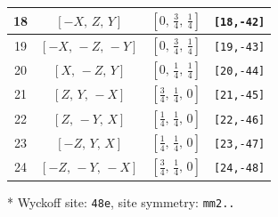 \documentclass[fleqn,8pt]{jsarticle}
\begin{document}
\begin{longtable}{cccc}
18 & $\left[ - X,\, Z,\, Y \right]$ & $\left[ 0,\, \frac{3}{4},\, \frac{1}{4} \right]$ & {\tt [18,-42]} \\ \hline
19 & $\left[ - X,\, - Z,\, - Y \right]$ & $\left[ 0,\, \frac{3}{4},\, \frac{1}{4} \right]$ & {\tt [19,-43]} \\ \hline
20 & $\left[ X,\, - Z,\, Y \right]$ & $\left[ 0,\, \frac{1}{4},\, \frac{1}{4} \right]$ & {\tt [20,-44]} \\ \hline
21 & $\left[ Z,\, Y,\, - X \right]$ & $\left[ \frac{3}{4},\, \frac{1}{4},\, 0 \right]$ & {\tt [21,-45]} \\ \hline
22 & $\left[ Z,\, - Y,\, X \right]$ & $\left[ \frac{1}{4},\, \frac{1}{4},\, 0 \right]$ & {\tt [22,-46]} \\ \hline
23 & $\left[ - Z,\, Y,\, X \right]$ & $\left[ \frac{1}{4},\, \frac{1}{4},\, 0 \right]$ & {\tt [23,-47]} \\ \hline
24 & $\left[ - Z,\, - Y,\, - X \right]$ & $\left[ \frac{3}{4},\, \frac{1}{4},\, 0 \right]$ & {\tt [24,-48]} \\
\end{longtable}
* Wyckoff site: {\tt 48e}, site symmetry: {\tt mm2..}
\renewcommand{\arraystretch}{1.2}
\end{document}
